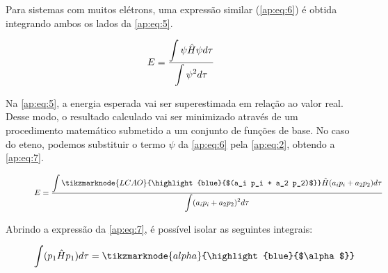 Para sistemas com muitos elétrons, uma expressão similar (\autoref{ap:eq:6}) é obtida integrando ambos os lados da \autoref{ap:eq:5}.

\begin{equation}
    \vspace{2\baselineskip}
\label{ap:eq:6}
    E = \frac{\displaystyle \int \psi \hat{H} \psi d\tau}{\displaystyle \int \psi^2 d\tau}
\end{equation}

Na \autoref{ap:eq:5}, a energia esperada vai ser superestimada em relação ao valor real. Desse modo, o resultado calculado vai ser minimizado através de um procedimento matemático submetido a um conjunto de funções de base. No caso do eteno, podemos substituir o termo $\psi$ da \autoref{ap:eq:6} pela \autoref{ap:eq:2}, obtendo a \autoref{ap:eq:7}.

\begin{figure}[htb]
    \vspace{2\baselineskip}
\begin{equation}
\label{ap:eq:7}
    E = \frac{\displaystyle \int \tikzmarknode{LCAO}{\highlight{blue}{$(a_i p_i + a_2 p_2)$}} \hat{H} (a_i p_i + a_2 p_2) d\tau}{\displaystyle \int (a_i p_i + a_2 p_2)^2 d\tau}
\end{equation}
\end{figure}

Abrindo a expressão da \autoref{ap:eq:7}, é possível isolar as seguintes integrais:

\begin{figure}[htb]
    \vspace{2\baselineskip}
\begin{equation}
\label{ap:eq:8}
    \displaystyle \int (p_1 \hat{H} p_1) d\tau = \tikzmarknode{alpha}{\highlight{blue}{$\alpha$}} \\
\end{equation}
\end{figure}

